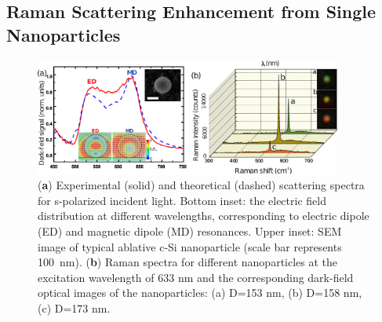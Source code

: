     \subsection{Raman Scattering Enhancement from Single Nanoparticles}
        \label{sec:RamanExp}

        \begin{figure}[!ht]
            \begin{center}
                \includegraphics[width=0.9\textwidth]{figs/results/enhance/EnhancementExperiment.eps}
            \end{center}
            \caption{(\textbf{a}) Experimental (solid) and theoretical (dashed) scattering spectra for s-polarized incident light.
            Bottom inset: the electric field distribution at different wavelengths, corresponding to electric dipole (ED) and magnetic
            dipole (MD) resonances. Upper inset: SEM image of typical ablative c-Si nanoparticle (scale bar represents 100~nm). (\textbf{b})
            Raman spectra for different nanoparticles at the excitation wavelength of 633 nm and the corresponding dark-field optical images of the
            nanoparticles: (a) D=153 nm, (b) D=158 nm, (c) D=173 nm.}
            \label{fig:EnhancementExp}
        \end{figure}


